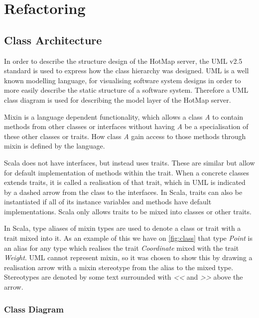 \section{Refactoring} \label{sec:s4_refactoring}



\subsection{Class Architecture}
In order to describe the structure design of the HotMap server, the UML v2.5 standard is used to express how the class hierarchy was designed. UML is a well known modelling language, for visualising software system designs in order to more easily describe the static structure of a software system.
Therefore a UML class diagram is used for describing the model layer of the HotMap server.

Mixin is a language dependent functionality, which allows a class \emph{A} to contain methods from other classes or interfaces without having \emph{A} be a specialisation of these other classes or traits. How class \emph{A} gain access to those methods through mixin is defined by the language. 

Scala does not have interfaces, but instead uses traits. These are similar but allow for default implementation of methods within the trait. When a concrete classes extends traits, it is called a realisation of that trait, which in UML is indicated by a dashed arrow from the class to the interfaces. In Scala, traits can also be instantiated if all of its instance variables and methods have default implementations. Scala only allows traits to be mixed into classes or other traits.

In Scala, type aliases of mixin types are used to denote a class or trait with a trait mixed into it. As an example of this we have on \cref{fig:class} that type \emph{Point} is an alias for any type which realises the trait \emph{Coordinate} mixed with the trait \emph{Weight}. UML cannot represent mixin, so it was chosen to show this by drawing a realisation arrow with a mixin stereotype from the alias to the mixed type. Stereotypes are denoted by some text surrounded with \emph{<<} and \emph{>>} above the arrow.

\subsubsection{Class Diagram}

